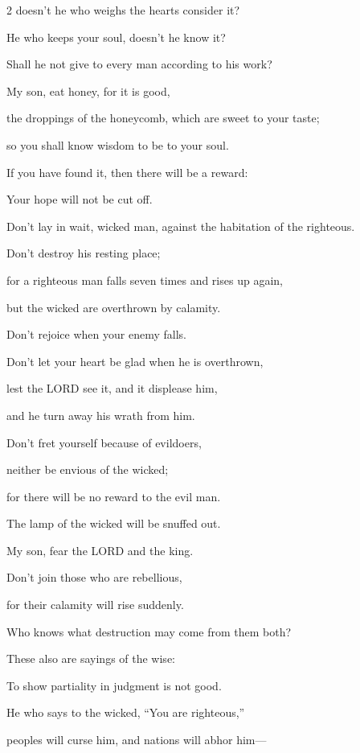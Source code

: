 \begin{multicols}{2}
doesn’t he who weighs the hearts consider it?

He who keeps your soul, doesn’t he know it?

Shall he not give to every man according to his work?


\myverse{}My son, eat honey, for it is good,

the droppings of the honeycomb, which are sweet to your taste;


\myverse{}so you shall know wisdom to be to your soul.

If you have found it, then there will be a reward:

Your hope will not be cut off.


\myverse{}Don’t lay in wait, wicked man, against the habitation of the
righteous.

Don’t destroy his resting place;


\myverse{}for a righteous man falls seven times and rises up again,

but the wicked are overthrown by calamity.


\myverse{}Don’t rejoice when your enemy falls.

Don’t let your heart be glad when he is overthrown,


\myverse{}lest the LORD see it, and it displease him,

and he turn away his wrath from him.


\myverse{}Don’t fret yourself because of evildoers,

neither be envious of the wicked;


\myverse{}for there will be no reward to the evil man.

The lamp of the wicked will be snuffed out.


\myverse{}My son, fear the LORD and the king.

Don’t join those who are rebellious,


\myverse{}for their calamity will rise suddenly.

Who knows what destruction may come from them both?


\vspace{\baselineskip} 
\myverse{}These also are sayings of the wise:

\vspace{\baselineskip} 
To show partiality in judgment is not good.


\myverse{}He who says to the wicked, “You are righteous,”

peoples will curse him, and nations will abhor him—



\end{multicols}
